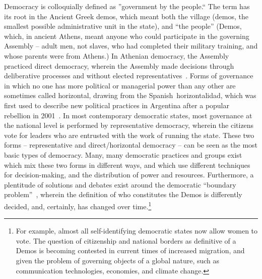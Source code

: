 Democracy is colloquially defined as ''government by the people.`` The term has
its root in the Ancient Greek demos, which meant both the village (demos, the
smallest possible administrative unit in the state), and ``the people'' (Demos,
which, in ancient Athens, meant anyone who could participate in the governing
Assembly -- adult men, not slaves, who had completed their military training,
and whose parents were from Athens.) In Athenian democracy, the Assembly
practiced direct democracy, wherein the Assembly made decisions through
deliberative processes and without elected representatives~\cite{blackwell2003athenian}. Forms of
governance in which no one has more political or managerial power than any other
are sometimes called horizontal, drawing from the Spanish horizontalidad, which
was first used to describe new political practices in Argentina after a popular
rebellion in 2001~\cite{sitrin2012everyday}. In most contemporary democratic states, most governance at the national level is performed by representative democracy,
wherein the citizens vote for leaders who are entrusted with the work of running
the state. These two forms – representative and direct/horizontal democracy --
can be seen as the most basic types of democracy. Many, many democratic
practices and groups exist which mix these two forms in different ways, and
which use different techniques for decision-making, and the distribution of
power and resources. Furthermore, a plentitude of solutions and debates exist
around the democratic ``boundary problem''~\cite{sep-global-democracy}, wherein the definition of
who constitutes the Demos is differently decided, and, certainly, has changed
over time.\footnote{For example, almost all self-identifying democratic states
now allow women to vote. The question of citizenship and national borders as
definitive of a Demos is becoming contested in current times of increased
migration, and given the problem of governing objects of a global nature, such
as communication technologies, economies, and climate change.}

